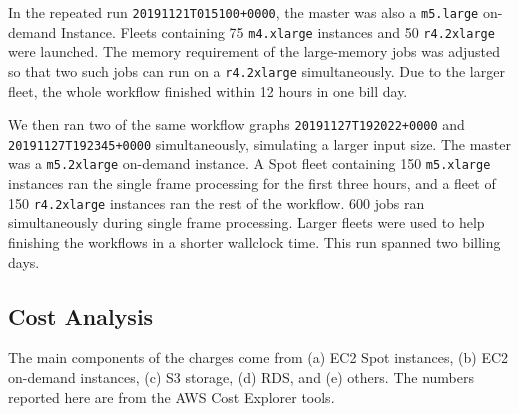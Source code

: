 In the repeated run \texttt{20191121T015100+0000}, the master was also a \texttt{m5.large} on-demand Instance.
Fleets containing 75 \texttt{m4.xlarge} instances and 50 \texttt{r4.2xlarge} were launched.
The memory requirement of the large-memory jobs was adjusted so that two such jobs can run on a \texttt{r4.2xlarge} simultaneously.
Due to the larger fleet, the whole workflow finished within 12 hours in one bill day.

We then ran two of the same workflow graphs \texttt{20191127T192022+0000} and \texttt{20191127T192345+0000} simultaneously, simulating a larger input size.
The master was a \texttt{m5.2xlarge} on-demand instance.
A Spot fleet containing 150 \texttt{m5.xlarge} instances ran the single frame processing for the first three hours, and a fleet of 150 \texttt{r4.2xlarge} instances ran the rest of the workflow.
600 jobs ran simultaneously during single frame processing.
Larger fleets were used to help finishing the workflows in a shorter wallclock time.
This run spanned two billing days.

\subsection{Cost Analysis}

The main components of the charges come from (a) EC2 Spot instances, (b) EC2 on-demand instances, (c) S3 storage, (d) RDS, and (e) others.
The numbers reported here are from the AWS Cost Explorer tools.

